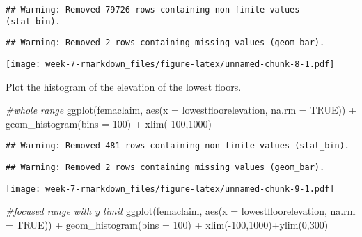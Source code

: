 \documentclass[
]{article}
\newenvironment{Shaded}{\begin{snugshade}}{\end{snugshade}}
\newcommand{\AttributeTok}[1]{\textcolor[rgb]{0.77,0.63,0.00}{#1}}
\newcommand{\CommentTok}[1]{\textcolor[rgb]{0.56,0.35,0.01}{\textit{#1}}}
\newcommand{\ConstantTok}[1]{\textcolor[rgb]{0.00,0.00,0.00}{#1}}
\newcommand{\DecValTok}[1]{\textcolor[rgb]{0.00,0.00,0.81}{#1}}
\newcommand{\FunctionTok}[1]{\textcolor[rgb]{0.00,0.00,0.00}{#1}}
\newcommand{\NormalTok}[1]{#1}
\newcommand{\SpecialCharTok}[1]{\textcolor[rgb]{0.00,0.00,0.00}{#1}}
\begin{document}
\begin{verbatim}
## Warning: Removed 79726 rows containing non-finite values (stat_bin).
\end{verbatim}

\begin{verbatim}
## Warning: Removed 2 rows containing missing values (geom_bar).
\end{verbatim}

\texttt{[image: week-7-rmarkdown\_files/figure-latex/unnamed-chunk-8-1.pdf]}

Plot the histogram of the elevation of the lowest floors.

\begin{Shaded}
\begin{Highlighting}[]
\CommentTok{\#whole range}
\FunctionTok{ggplot}\NormalTok{(femaclaim, }\FunctionTok{aes}\NormalTok{(}\AttributeTok{x =}\NormalTok{ lowestfloorelevation, }\AttributeTok{na.rm =} \ConstantTok{TRUE}\NormalTok{)) }\SpecialCharTok{+} \FunctionTok{geom\_histogram}\NormalTok{(}\AttributeTok{bins =} \DecValTok{100}\NormalTok{) }\SpecialCharTok{+} \FunctionTok{xlim}\NormalTok{(}\SpecialCharTok{{-}}\DecValTok{100}\NormalTok{,}\DecValTok{1000}\NormalTok{)}
\end{Highlighting}
\end{Shaded}

\begin{verbatim}
## Warning: Removed 481 rows containing non-finite values (stat_bin).
\end{verbatim}

\begin{verbatim}
## Warning: Removed 2 rows containing missing values (geom_bar).
\end{verbatim}

\texttt{[image: week-7-rmarkdown\_files/figure-latex/unnamed-chunk-9-1.pdf]}

\begin{Shaded}
\begin{Highlighting}[]
\CommentTok{\#focused range with y limit}
\FunctionTok{ggplot}\NormalTok{(femaclaim, }\FunctionTok{aes}\NormalTok{(}\AttributeTok{x =}\NormalTok{ lowestfloorelevation, }\AttributeTok{na.rm =} \ConstantTok{TRUE}\NormalTok{)) }\SpecialCharTok{+} \FunctionTok{geom\_histogram}\NormalTok{(}\AttributeTok{bins =} \DecValTok{100}\NormalTok{) }\SpecialCharTok{+} \FunctionTok{xlim}\NormalTok{(}\SpecialCharTok{{-}}\DecValTok{100}\NormalTok{,}\DecValTok{1000}\NormalTok{)}\SpecialCharTok{+}\FunctionTok{ylim}\NormalTok{(}\DecValTok{0}\NormalTok{,}\DecValTok{300}\NormalTok{)}
\end{Highlighting}
\end{Shaded}
\end{document}
